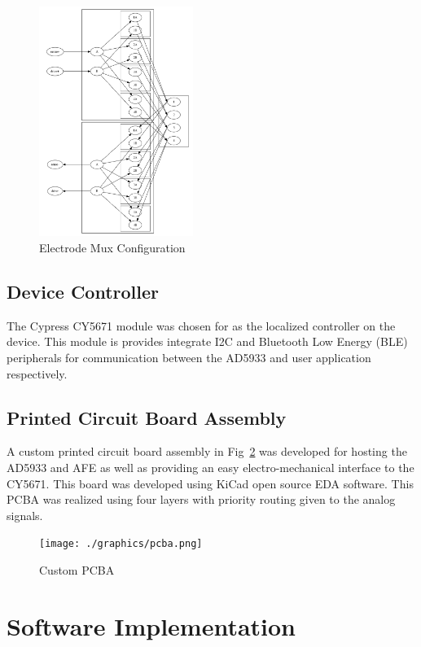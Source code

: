 \documentclass[]{IEEEtran}
\begin{document}
\begin{figure} %
\centering
\includegraphics[width=5cm ]{./graphics/mux.png}
\centering
\caption{Electrode Mux Configuration}
\label{fig:mux}
\end{figure}


\subsection{Device Controller}
The Cypress CY5671\cite{noauthor_cy5671:_nodate} module was chosen for as the localized controller on the device. This module is provides integrate I2C and Bluetooth Low Energy (BLE) peripherals for communication between the AD5933 and user application respectively. 

\subsection{Printed Circuit Board Assembly}
A custom printed circuit board assembly in Fig~\ref{fig:pcb} was developed for hosting the AD5933 and AFE as well as providing an easy electro-mechanical interface to the CY5671. This board was developed using KiCad open source EDA software\cite{noauthor_kicad_nodate}. This PCBA was realized using four layers with priority routing given to the analog signals.

\begin{figure} %
\centering
\texttt{[image: ./graphics/pcba.png]}
\centering
\caption{Custom PCBA}
\label{fig:pcb}
\end{figure}


\section{Software Implementation}
\end{document}

